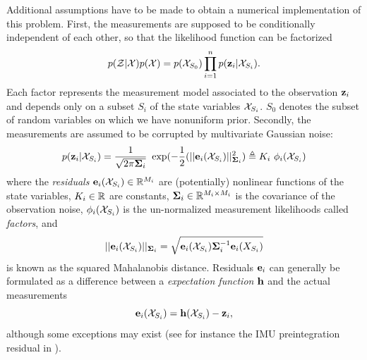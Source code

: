 Additional assumptions have to be made to obtain a numerical implementation of this problem.
First, the measurements are supposed to be conditionally independent of each other, so that the likelihood function can be factorized 
%
\begin{equation}
    p(\mathcal{Z} | \mathcal{X}) p(\mathcal{X}) =  p(\mathcal{X}_{S_0}) \prod_{i=1}^{n} p({\bf z}_i | \mathcal{X}_{S_i}).
\end{equation}
%
Each factor represents the measurement model associated to the  observation ${\bf z}_i$ and depends only on a subset $S_i$ of the state variables $\mathcal{X}_{S_i}$. 
$S_0$ denotes the subset of random variables on which we have nonuniform prior.
Secondly, the measurements are assumed to be corrupted by multivariate Gaussian noise:
%
\begin{equation}
    p({\bf z}_i | \mathcal{X}_{S_i}) = \frac{1}{\sqrt{2\pi{\bm \Sigma}_i}} ~ \exp(- \frac{1}{2} (||{\bf e}_i(\mathcal{X}_{S_i})||^2_{{\bm \Sigma}_i}) \triangleq K_i~\phi_i(\mathcal{X}_{S_i})
\end{equation}
%
where the \textit{residuals} ${\bf e}_i(\mathcal{X}_{S_i}) \in \mathbb{R}^{M_i}$ are (potentially) nonlinear functions of the state variables, $K_i \in \mathbb{R}$ are constants, 
${\bm \Sigma}_i \in \mathbb{R}^{M_i \times M_i}$ is the covariance of the observation noise,
$\phi_i(\mathcal{X}_{S_i})$ is the un-normalized measurement likelihoods called \textit{factors}, and 
%
\begin{equation*}
    ||{\bf e}_i(\mathcal{X}_{S_i})||_{{\bm \Sigma}_i} = \sqrt{{\bf e}_i(\mathcal{X}_{S_i}) {\bm \Sigma}_i^{-1} {\bf e}_i(X_{S_i})}
\end{equation*}
%
is known as the squared Mahalanobis distance. 
Residuals ${\bf e}_i$ can generally be formulated as a difference between a \textit{expectation function} ${\bf h}$ and the actual measurements
%
\begin{equation}
    {\bf e}_i(\mathcal{X}_{S_i}) = {\bf h}(\mathcal{X}_{S_i}) - {\bf z}_i,
    \label{eq:error_expectation}
\end{equation}
%
although some exceptions may exist (see for instance the IMU preintegration residual  in ).

